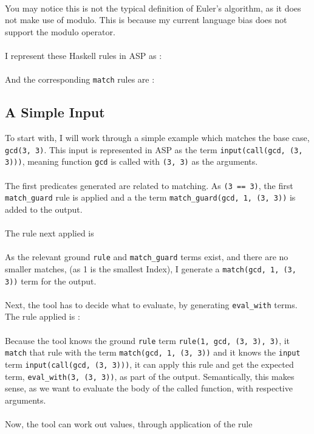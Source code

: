  
\mbox{} \\
You may notice this is not the typical definition of Euler's algorithm, as it does not make use of modulo. This is because my current language bias does not support the modulo operator. \\ \\
I represent these Haskell rules in ASP as :\\

 
\mbox{} \\
And the corresponding \lstinline{match} rules are :\\ %

 

\subsection{A Simple Input}
To start with, I will work through a simple example which matches the base case, \lstinline{gcd(3, 3)}. This input is represented in ASP as the term \lstinline{input(call(gcd, (3, 3)))}, meaning function \lstinline{gcd} is called with \lstinline{(3, 3)} as the arguments. \\ \\
The first predicates generated are related to matching. As \lstinline{(3 == 3)}, the first \lstinline{match_guard} rule is applied and a the term \lstinline{match_guard(gcd, 1, (3, 3))} is added to the output.\\ \\ %
The rule next applied is \\


\mbox{} \\
As the relevant ground \lstinline{rule} and \lstinline{match_guard} terms exist, and there are no smaller matches, (as 1 is the smallest Index), I generate a \lstinline{match(gcd, 1, (3, 3))} term for the output. \\ \\ %
Next, the tool has to decide what to evaluate, by generating \lstinline{eval_with} terms. The rule applied is :\\ %


\mbox{} \\
Because the tool knows the ground \lstinline{rule} term \lstinline{rule(1, gcd, (3, 3), 3)}, it \lstinline{match} that rule with the term \lstinline{match(gcd, 1, (3, 3))} and it knows the \lstinline{input} term \lstinline{input(call(gcd, (3, 3)))}, it can apply this rule and get the expected term, \lstinline{eval_with(3, (3, 3))}, as part of the output. Semantically, this makes sense, as we want to evaluate the body of the called function, with respective arguments. \\ \\%
Now, the tool can work out values, through application of the rule \\

